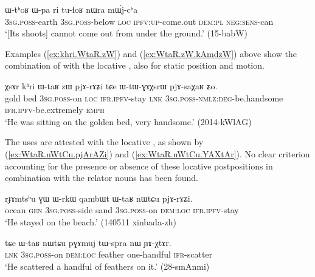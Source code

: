 \begin{exe}
\ex \label{ex:Wpa.ri.tulhoR}
\gll ɯ-tʰoʁ ɯ-pa ri tu-ɬoʁ nɯra mɯ́j-cʰa \\
\textsc{3sg}.\textsc{poss}-earth \textsc{3sg}.\textsc{poss}-below \textsc{loc} \textsc{ipfv}:\textsc{up}-come.out \textsc{dem}:\textsc{pl} \textsc{neg}:\textsc{sens}-can \\
\glt `[Its shoots] cannot come out from under the ground.'  (15-babW)
\end{exe}

Examples (\ref{ex:khri.WtaR.zW}) and (\ref{ex:WtaR.zW.kAmdzW}) above show the combination of  with the locative , also for static position and motion.

\begin{exe}
\ex \label{ex:khri.WtaR.zW}
\gll χsɤr kʰri ɯ-taʁ zɯ pjɤ-rɤʑi tɕe ɯ-tɯ-ɣɤχsrɯ pjɤ-saχaʁ ʑo. \\
gold bed \textsc{3sg}.\textsc{poss}-on \textsc{loc} \textsc{ifr}.\textsc{ipfv}-stay \textsc{lnk} \textsc{3sg}.\textsc{poss}-\textsc{nmlz}:\textsc{deg}-be.handsome \textsc{ifr}.\textsc{ipfv}-be.extremely \textsc{emph} \\
\glt `He was sitting on the golden bed, very handsome.' (2014-kWlAG)
\end{exe}

The uses are attested with the locative , as shown by (\ref{ex:WtaR.nWtCu.pjArAZi}) and (\ref{ex:WtaR.nWtCu.YAXtAr}). No clear criterion accounting for the presence or absence of these locative postpositions in combination with the relator nouns has been found.

\begin{exe}
\ex \label{ex:WtaR.nWtCu.pjArAZi}
\gll  rɟɤmtsʰu ɣɯ ɯ-rkɯ qambɯt ɯ-taʁ nɯtɕu pjɤ-rɤʑi. \\
ocean \textsc{gen} \textsc{3sg}.\textsc{poss}-side sand \textsc{3sg}.\textsc{poss}-on \textsc{dem}:\textsc{loc} \textsc{ifr}.\textsc{ipfv}-stay \\
\glt `He stayed on the beach.' (140511 xinbada-zh)
\end{exe}

\begin{exe}
\ex \label{ex:WtaR.nWtCu.YAXtAr}
\gll tɕe ɯ-taʁ nɯtɕu pɣɤmuj tɯ-spra nɯ ɲɤ-χtɤr. \\
\textsc{lnk} \textsc{3sg}.\textsc{poss}-on \textsc{dem}:\textsc{loc} feather one-handful \textsc{ifr}-scatter \\
\glt `He scattered a handful of feathers on it.' (28-smAnmi)
\end{exe}

